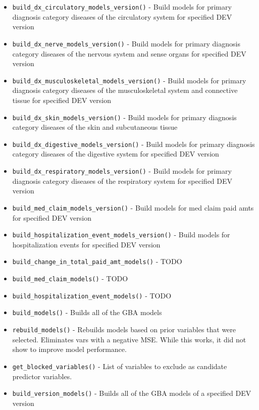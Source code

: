 \documentclass[
]{book}
\begin{document}
\begin{itemize}
\item
  \texttt{build\_dx\_circulatory\_models\_version()} - Build models for primary diagnosis category diseases of the circulatory system for specified DEV version
\item
  \texttt{build\_dx\_nerve\_models\_version()} - Build models for primary diagnosis category diseases of the nervous system and sense organs for specified DEV version
\item
  \texttt{build\_dx\_musculoskeletal\_models\_version()} - Build models for primary diagnosis category diseases of the musculoskeletal system and connective tissue for specified DEV version
\item
  \texttt{build\_dx\_skin\_models\_version()} - Build models for primary diagnosis category diseases of the skin and subcutaneous tissue
\item
  \texttt{build\_dx\_digestive\_models\_version()} - Build models for primary diagnosis category diseases of the digestive system for specified DEV version
\item
  \texttt{build\_dx\_respiratory\_models\_version()} - Build models for primary diagnosis category diseases of the respiratory system for specified DEV version
\item
  \texttt{build\_med\_claim\_models\_version()} - Build models for med claim paid amts for specified DEV version
\item
  \texttt{build\_hospitalization\_event\_models\_version()} - Build models for hospitalization events for specified DEV version
\item
  \texttt{build\_change\_in\_total\_paid\_amt\_models()} - TODO
\item
  \texttt{build\_med\_claim\_models()} - TODO
\item
  \texttt{build\_hospitalization\_event\_models()} - TODO
\item
  \texttt{build\_models()} - Builds all of the GBA models
\item
  \texttt{rebuild\_models()} - Rebuilds models based on prior variables that were selected. Eliminates vars with a negative MSE. While this works, it did not show to improve model performance.
\item
  \texttt{get\_blocked\_variables()} - List of variables to exclude as candidate predictor variables.
\item
  \texttt{build\_version\_models()} - Builds all of the GBA models of a specified DEV version
\end{itemize}
\end{document}
